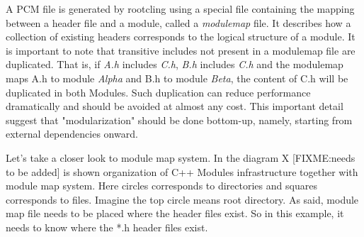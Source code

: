\documentclass[12pt]{iopart}
\begin{document}
A PCM file is generated by rootcling using a special file containing the mapping between a header file and a module, called a \textit{modulemap} file. It describes how a collection of existing headers corresponds to the logical structure of a module. It is important to note that transitive includes not present in a modulemap file are duplicated. That is, if \textit{A.h} includes \textit{C.h}, \textit{B.h} includes \textit{C.h} and the modulemap maps A.h to module \textit{Alpha} and B.h to module \textit{Beta}, the content of C.h will be duplicated in both Modules. Such duplication can reduce performance dramatically and should be avoided at almost any cost. This important detail suggest that "modularization" should be done bottom-up, namely, starting from external dependencies onward.








Let’s take a closer look to module map system. In the diagram X [FIXME:needs to be added] is shown organization of C++ Modules infrastructure together with module map system. Here circles corresponds to directories and squares corresponds to files. Imagine the top circle means root directory. As said, module map file needs to be placed where the header files exist. So in this example, it needs to know where the *.h header files exist.
\end{document}
